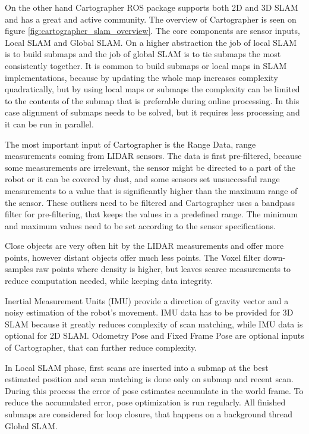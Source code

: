 On the other hand Cartographer ROS package supports both 2D and 3D SLAM and has a great and active community. The overview 
of Cartographer is seen on figure \ref{fig:cartographer_slam_overview}. The core components are sensor inputs, Local SLAM
and Global SLAM. On a higher abstraction the job of local SLAM is to build submaps and the job of global SLAM is to tie 
submaps the most consistently together. It is common to build submaps or local maps in SLAM implementations, because by 
updating the whole map increases complexity quadratically, but by using local maps or submaps the complexity can be limited
to the contents of the submap that is preferable during online processing. In this case alignment of submaps needs to be solved,
but it requires less processing and it can be run in parallel.

The most important input of Cartographer is the Range Data, range measurements coming from LIDAR sensors. The data is first 
pre-filtered, because some measurements are irrelevant, the sensor might be directed to a part of the robot or it can be covered
by dust, and some sensors set unsuccessful range measurements to a value that is significantly higher than the maximum range of 
the sensor. These outliers need to be filtered and Cartographer uses a bandpass filter for pre-filtering, that keeps the values
in a predefined range. The minimum and maximum values need to be set according to the sensor specifications. 

Close objects are very often hit by the LIDAR measurements and offer more points, however distant objects offer much less points.
The Voxel filter down-samples raw points where density is higher, but leaves scarce measurements to reduce computation needed,
while keeping data integrity.

Inertial Measurement Units (IMU) provide a direction of gravity vector and a noisy estimation of the robot's movement. IMU data
has to be provided for 3D SLAM because it greatly reduces complexity of scan matching, while IMU data is optional for 2D SLAM.
Odometry Pose and Fixed Frame Pose are optional inputs of Cartographer, that can further reduce complexity.

In Local SLAM phase, first scans are inserted into a submap at the best estimated position and scan matching is done only on
submap and recent scan. During this process the error of pose estimates accumulate in the world frame. To reduce the accumulated
error, pose optimization is run regularly. All finished submaps are considered for loop closure, that happens on a background 
thread Global SLAM.




